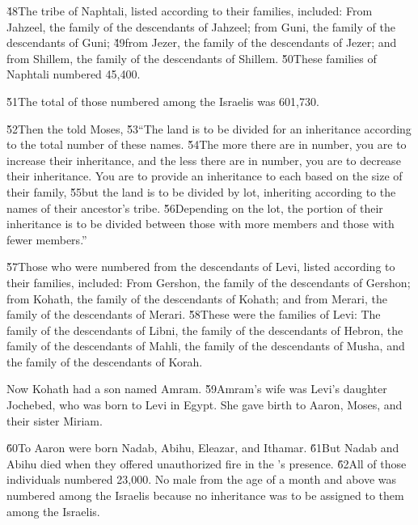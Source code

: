 \v{48}The tribe of Naphtali, listed according to their families, included: From Jahzeel, the family of the descendants of Jahzeel; from Guni, the family of the descendants of Guni; \v{49}from Jezer, the family of the descendants of Jezer; and from Shillem, the family of the descendants of Shillem. \v{50}These families of Naphtali numbered 45,400.

\v{51}The total of those numbered among the Israelis was 601,730.

\v{52}Then the  told Moses, \v{53}``The land is to be divided for an inheritance according to the total number of these names. \v{54}The more there are in number, you are to increase their inheritance, and the less there are in number, you are to decrease their inheritance. You are to provide an inheritance to each based on the size of their family, \v{55}but the land is to be divided by lot, inheriting according to the names of their ancestor's tribe. \v{56}Depending on the lot, the portion of their inheritance is to be divided between those with more members and those with fewer members.''

\v{57}Those who were numbered from the descendants of Levi, listed according to their families, included: From Gershon, the family of the descendants of Gershon; from Kohath, the family of the descendants of Kohath; and from Merari, the family of the descendants of Merari. \v{58}These were the families of Levi: The family of the descendants of Libni, the family of the descendants of Hebron, the family of the descendants of Mahli, the family of the descendants of Musha, and the family of the descendants of Korah.

Now Kohath had a son named Amram. \v{59}Amram's wife was Levi's daughter Jochebed, who was born to Levi in Egypt. She gave birth to Aaron, Moses, and their sister Miriam.

\v{60}To Aaron were born Nadab, Abihu, Eleazar, and Ithamar. \v{61}But Nadab and Abihu died when they offered unauthorized fire in the 's presence. \v{62}All of those individuals numbered 23,000. No male from the age of a month and above was numbered among the Israelis because no inheritance was to be assigned to them among the Israelis.

